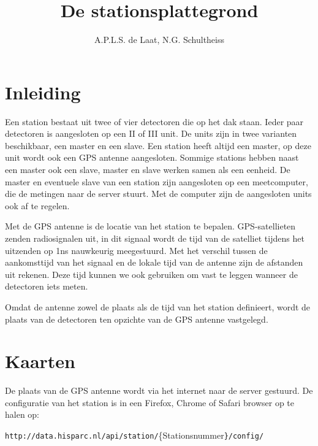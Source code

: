 



\title{De stationsplattegrond}
\author{A.P.L.S. de Laat, N.G. Schultheiss}

\maketitle

\section{Inleiding}

Een \hisparc station bestaat uit twee of vier detectoren die op het dak
staan. Ieder paar detectoren is aangesloten op een \hisparc II of \hisparc
III unit. De \hisparc units zijn in twee varianten beschikbaar, een
master en een slave. Een \hisparc station heeft altijd een \hisparc
master, op deze unit wordt ook een GPS antenne aangesloten. Sommige
stations hebben naast een master ook een slave, master en slave werken
samen als een eenheid. De master en eventuele slave van een station zijn
aangesloten op een meetcomputer, die de metingen naar de \hisparc server
stuurt. Met de computer zijn de aangesloten units ook af te regelen.

Met de GPS antenne is de locatie van het station te bepalen.
GPS-satellieten zenden radiosignalen uit, in dit signaal wordt de tijd
van de satelliet tijdens het uitzenden op 1ns nauwkeurig meegestuurd.
Met het verschil tussen de aankomsttijd van het signaal en de lokale
tijd van de antenne zijn de afstanden uit rekenen. Deze tijd kunnen we
ook gebruiken om  vast te leggen wanneer de detectoren iets meten. 

Omdat de antenne zowel de plaats als de tijd van het station definieert,
wordt de plaats van de detectoren ten opzichte van de GPS antenne
vastgelegd.


\section{Kaarten}

De plaats van de GPS antenne wordt via het internet naar de \hisparc
server gestuurd. De configuratie van het station is in een Firefox,
Chrome of Safari browser op te halen op: 

\texttt{\small{http://data.hisparc.nl/api/station/}}{\small{\{Stationsnummer}}\texttt{\small{\}/config/}}{\small \par}

